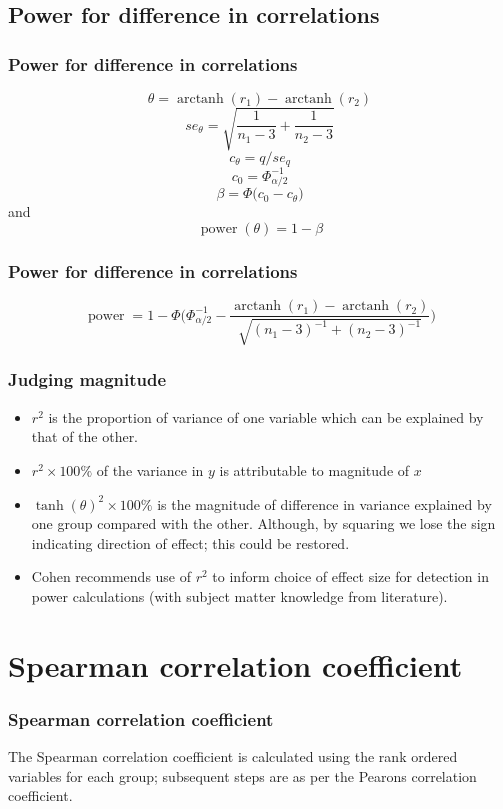 \documentclass{beamer}
\DeclareMathOperator\arctanh{arctanh}
\DeclareMathOperator\power{power}
\begin{document}
  \subsection{Power for difference in correlations}   
  \begin{frame}
    \frametitle{Power for difference in correlations }  
    \[\theta     = \arctanh(r_1) - \arctanh(r_2)            \]
    \[se_\theta    = \sqrt{\frac{1}{n_1-3}+\frac{1}{n_2-3}} \]
    \[c_\theta     = q / se_q                               \] 
    \[c_0   =  \Phi_{\alpha/2}^{-1}                         \]
    \[\beta = \Phi \bigg( c_0 - c_\theta \bigg)             \]
    and
    \[ \power(\theta) = 1 - \beta                           \]
  \end{frame}
  
  \begin{frame}
    \frametitle{Power for difference in correlations}  
    \[ \power = 1- \Phi \bigg(\Phi_{\alpha/2}^{-1} - \frac{\arctanh(r_1) - \arctanh(r_2)}{\sqrt{(n_1-3)^{-1} + (n_2-3)^{-1}}} \bigg) \]
  \end{frame}

  \begin{frame}
    \frametitle{Judging magnitude}  
      \begin{itemize}         
				\item \(r^2\) is the proportion of variance of one variable which can be explained by that of the other.
	      \item \(r^2 \times 100\%\) of the variance in \(y\) is attributable to magnitude of \(x\)    
 	      \item \(\tanh(\theta)^2 \times 100\%\) is the magnitude of difference in variance explained by one group compared with the other.  Although, by squaring we lose the sign indicating direction of effect; this could be restored.
        \item Cohen  recommends use of \(r^2\) to inform choice of effect size for detection in power calculations (with subject matter knowledge from literature).
      \end{itemize}
  \end{frame}
  
  \section{Spearman correlation coefficient}
  \begin{frame}
    \frametitle{Spearman correlation coefficient}
    The Spearman correlation coefficient is calculated using the rank ordered variables for each group; subsequent steps are as per the Pearons correlation coefficient.
  \end{frame}    
  
\end{document}
